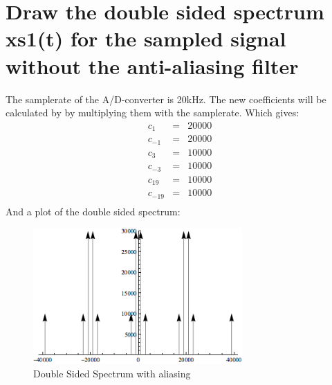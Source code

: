 \documentclass[a4wide,10pt]{article}
\begin{document}

\newpage

\section{Draw the double sided spectrum xs1(t) for the sampled signal without the
anti-aliasing filter} %
\label{sec:draw_the_double_sided_spectrum_xs1_t_for_the_sampled_signal_without_the_anti_aliasing_filter}
The samplerate of the A/D-converter is 20kHz. The new coefficients will be calculated by by multiplying them with the samplerate. Which gives:
\begin{eqnarray}
	c_1&=&20000 \nonumber \\
	c_{-1}&=&20000 \nonumber \\
	c_3&=&10000 \nonumber \\
	c_{-3}&=&10000 \nonumber \\
	c_{19}&=&10000 \nonumber \\
	c_{-19}&=&10000 \nonumber \\
\end{eqnarray}
And a plot of the double sided spectrum:
\begin{figure}[htbp]
	\centering
		\includegraphics[width=8cm]{images/double-sided-spectrum-2.png}
	\caption{Double Sided Spectrum with aliasing}
	\label{fig:images_double-sided-spectrum-2}
\end{figure}
\newpage
\end{document}
